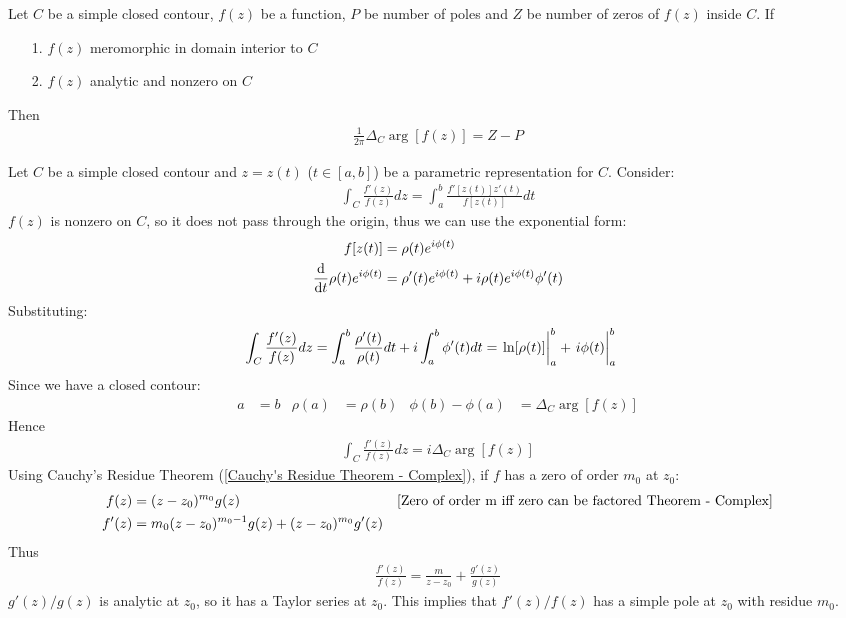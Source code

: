 \documentclass[12pt, english]{book}
\makeatletter
\renewenvironment{proof}[1][\proofname]{\par
	\pushQED{\qed}%
	\normalfont \topsep6\p@\@plus6\p@\relax
	\list{}{%
		\settowidth{\leftmargin}{\itshape\proofname:\hskip\labelsep}%
		\setlength{\labelwidth}{0pt}%
		\setlength{\itemindent}{-\leftmargin}%
		}%
	\item[\hskip\labelsep\itshape#1\@addpunct{:}]\ignorespaces
	}{\popQED\endlist\@endpefalse}
\makeatother
\begin{document}
	\begin{theorem}
		\label{Argument Principle Theorem - Complex}
		Let \(C\) be a simple closed contour, \(f(z)\) be a function, \(P\) be number of poles and \(Z\) be number of zeros of \(f(z)\) inside \(C\). If
		\begin{itemize}
			\item[1.] \(f(z)\) meromorphic in domain interior to \(C\)
			\item[2.] \(f(z)\) analytic and nonzero on \(C\)
		\end{itemize}
		Then 
		\begin{align*}
			\frac{1}{2\pi} \Delta_C \arg[f(z)] = Z - P
		\end{align*}
	\end{theorem}
	\begin{proof}
		Let \(C\) be a simple closed contour and \(z = z(t)\) (\(t \in [a, b]\)) be a parametric representation for \(C\). Consider:
		\begin{align*}
			\int_C \frac{f'(z)}{f(z)} dz = \int_{a}^{b} \frac{f'[z(t)] z'(t)}{f[z(t)]} dt
		\end{align*}
		\(f(z)\) is nonzero on \(C\), so it does not pass through the origin, thus we can use the exponential form:
		\begin{align*}
			f[z(t)] &= \rho(t) e^{i\phi(t)} \\
			\dv{t} \rho(t) e^{i\phi(t)} &= \rho'(t) e^{i\phi(t)} + i\rho(t)e^{i\phi(t)} \phi'(t)
		\end{align*}
		Substituting:
		\begin{align*}
			\int_C \frac{f'(z)}{f(z)} dz 
			&= \int_{a}^{b} \frac{\rho'(t)}{\rho(t)} dt + i\int_{a}^{b} \phi'(t) dt 
			= \eval{\ln[\rho(t)]}_{a}^{b} + \eval{i\phi(t)}_{a}^{b}
		\end{align*}
		Since we have a closed contour:
		\begin{align*}
			a&=b & \rho(a) &= \rho(b) & \phi(b) - \phi(a) &= \Delta_C \arg[f(z)]
		\end{align*}
		Hence
		\begin{align*}
			\int_{C} \frac{f'(z)}{f(z)} dz = i\Delta_{C} \arg[f(z)]
		\end{align*}
		Using Cauchy's Residue Theorem (\cref{Cauchy's Residue Theorem - Complex}), if \(f\) has a zero of order \(m_0\) at \(z_0\):
		\begin{align*}
			f(z) &= (z-z_0)^{m_0} g(z) 
				& \text{\Cref{Zero of order m iff zero can be factored Theorem - Complex}} \\
			f'(z) &= m_0 (z-z_0)^{m_0 - 1} g(z) + (z-z_0)^{m_0} g'(z)
		\end{align*}
		Thus
		\begin{align*}
			\frac{f'(z)}{f(z)} = \frac{m}{z-z_0} + \frac{g'(z)}{g(z)}
		\end{align*}
		\(g'(z)/g(z)\) is analytic at \(z_0\), so it has a Taylor series at \(z_0\). This implies that \(f'(z)/f(z)\) has a simple pole at \(z_0\) with residue \(m_0\).
		

\end{proof}
\end{document}
